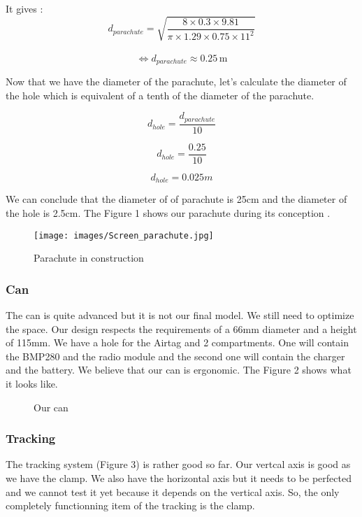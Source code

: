 \documentclass[]{article}
\begin{document}
It gives : 
\[
d_{parachute} = \sqrt{\frac{8 \times 0.3 \times 9.81}{\pi \times 1.29 \times 0.75 \times 11^2}}
\]
\\[1em] %
\[
\iff d_{parachute} \approx 0.25 \, \text{m}
\]

Now that we have the diameter of the parachute, let's calculate the diameter of the hole which is 
equivalent of a tenth of the diameter of the parachute. 

$$d_{hole} = \frac{d_{parachute}}{10}$$

$$d_{hole} = \frac{0.25}{10}$$


$$d_{hole} = 0.025m$$

We can conclude that the diameter of of parachute is 25cm and the diameter of the hole is 2.5cm. 
The Figure 1 shows our parachute during its conception .

\begin{figure}[h] 
    \centering
    \texttt{[image: images/Screen\_parachute.jpg]} 
    \caption{Parachute in construction}
\end{figure}

\subsubsection{Can}

The can is quite advanced but it is not our final model. We still need to optimize the space. Our design
respects the requirements of a 66mm diameter and a height of 115mm. We have a hole for the Airtag and 2
compartments. One will contain the BMP280 and the radio module and the second one will contain the charger
and the battery. We believe that our can is ergonomic. The Figure 2 shows what it looks like. 

\begin{figure}[h]
    \centering
    \hfill
    \caption{Our can}
\end{figure}


\subsubsection{Tracking}

The tracking system (Figure 3) is rather good so far. Our vertcal axis is good as we have the clamp. We also have
the horizontal axis but it needs to be perfected and we cannot test it yet because it depends on the 
vertical axis. So, the only completely functionning item of the tracking is the clamp.
\end{document}
